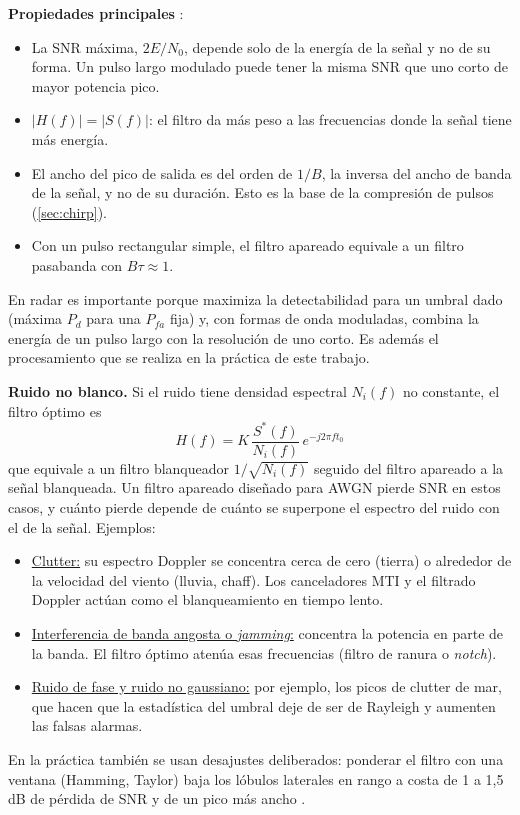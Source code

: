 \textbf{Propiedades principales} \cite{apunte, richards}:
\begin{itemize}
    \item La SNR máxima, $2E/N_0$, depende solo de la energía de la señal y no de su forma. Un pulso largo modulado puede tener la misma SNR que uno corto de mayor potencia pico.
    \item $|H(f)| = |S(f)|$: el filtro da más peso a las frecuencias donde la señal tiene más energía.
    \item El ancho del pico de salida es del orden de $1/B$, la inversa del ancho de banda de la señal, y no de su duración. Esto es la base de la compresión de pulsos (\autoref{sec:chirp}).
    \item Con un pulso rectangular simple, el filtro apareado equivale a un filtro pasabanda con $B\tau \approx 1$.
\end{itemize}
En radar es importante porque maximiza la detectabilidad para un umbral dado (máxima $P_d$ para una $P_{fa}$ fija) y, con formas de onda moduladas, combina la energía de un pulso largo con la resolución de uno corto. Es además el procesamiento que se realiza en la práctica de este trabajo.

\textbf{Ruido no blanco.} Si el ruido tiene densidad espectral $N_i(f)$ no constante, el filtro óptimo es \cite{apunte, skolnik}
\begin{equation}
    H(f) = K \, \frac{S^*(f)}{N_i(f)} \, e^{-j2\pi f t_0}
\end{equation}
que equivale a un filtro blanqueador $1/\sqrt{N_i(f)}$ seguido del filtro apareado a la señal blanqueada. Un filtro apareado diseñado para AWGN pierde SNR en estos casos, y cuánto pierde depende de cuánto se superpone el espectro del ruido con el de la señal. Ejemplos:
\begin{itemize}
    \item \underline{Clutter:} su espectro Doppler se concentra cerca de cero (tierra) o alrededor de la velocidad del viento (lluvia, chaff). Los canceladores MTI y el filtrado Doppler actúan como el blanqueamiento en tiempo lento.
    \item \underline{Interferencia de banda angosta o \textit{jamming}:} concentra la potencia en parte de la banda. El filtro óptimo atenúa esas frecuencias (filtro de ranura o \textit{notch}).
    \item \underline{Ruido de fase y ruido no gaussiano:} por ejemplo, los picos de clutter de mar, que hacen que la estadística del umbral deje de ser de Rayleigh y aumenten las falsas alarmas.
\end{itemize}
En la práctica también se usan desajustes deliberados: ponderar el filtro con una ventana (Hamming, Taylor) baja los lóbulos laterales en rango a costa de 1 a 1,5 dB de pérdida de SNR y de un pico más ancho \cite{richards}.

